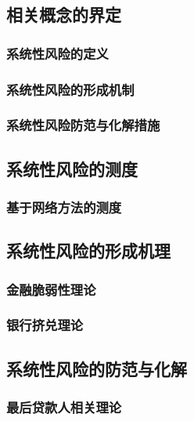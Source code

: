\newpage
\subsection{相关概念的界定}

\subsubsection{系统性风险的定义}

\subsubsection{系统性风险的形成机制}

\subsubsection{系统性风险防范与化解措施}

\newpage
\subsection{系统性风险的测度}

\subsubsection{基于网络方法的测度}

\newpage
\subsection{系统性风险的形成机理}

\subsubsection{金融脆弱性理论}

\subsubsection{银行挤兑理论}

\newpage
\subsection{系统性风险的防范与化解}

\subsubsection{最后贷款人相关理论}

